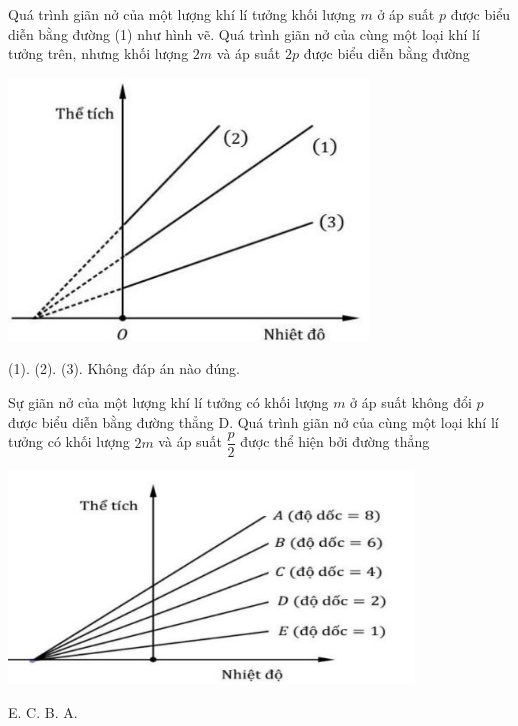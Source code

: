 \begin{ex}
Quá trình giãn nở của một lượng khí lí tưởng khối lượng $m$ ở áp suất $p$ được biểu diễn bằng đường (1) như hình vẽ. Quá trình giãn nở của cùng một loại khí lí tưởng trên, nhưng khối lượng $2m$ và áp suất $2p$ được biểu diễn bằng đường
\begin{center}
	\includegraphics[width=0.35\linewidth]{figs/VN12-Y24-PH-SYL-014P-5}
\end{center}
	
	\choice
	{\True (1).}
	{(2).}
	{(3).}
	{Không đáp án nào đúng.}
\end{ex}
\begin{ex}
	Sự giãn nở của một lượng khí lí tưởng có khối lượng $m$ ở áp suất không đổi $p$ được biểu diễn bằng đường thẳng D. Quá trình giãn nở của cùng một loại khí lí tưởng có khối lượng $2m$ và áp suất $\dfrac{p}{2}$ được thể hiện bởi đường thẳng
	\begin{center}
		\includegraphics[width=0.45\linewidth]{figs/VN12-Y24-PH-SYL-014P-6}
	\end{center} 
	
	\choice
	{E.}
	{C.}
	{B.}
	{\True A.}
\end{ex}
